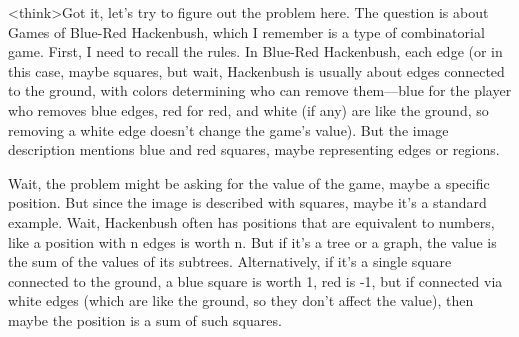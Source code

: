 <think>Got it, let's try to figure out the problem here. The question is about Games of Blue-Red Hackenbush, which I remember is a type of combinatorial game. First, I need to recall the rules. In Blue-Red Hackenbush, each edge (or in this case, maybe squares, but wait, Hackenbush is usually about edges connected to the ground, with colors determining who can remove them—blue for the player who removes blue edges, red for red, and white (if any) are like the ground, so removing a white edge doesn't change the game's value). But the image description mentions blue and red squares, maybe representing edges or regions. 

Wait, the problem might be asking for the value of the game, maybe a specific position. But since the image is described with squares, maybe it's a standard example. Wait, Hackenbush often has positions that are equivalent to numbers, like a position with n edges is worth n. But if it's a tree or a graph, the value is the sum of the values of its subtrees. Alternatively, if it's a single square connected to the ground, a blue square is worth 1, red is -1, but if connected via white edges (which are like the ground, so they don't affect the value), then maybe the position is a sum of such squares. 

